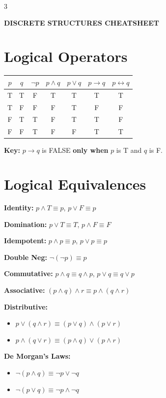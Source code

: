 \documentclass[10pt,landscape,a4paper]{article}
\newcommand{\globalopacity}{1}  %
\newcommand{\tand}{\wedge}
\newcommand{\tor}{\vee}
\newcommand{\tnot}{\neg}
\newcommand{\timplies}{\rightarrow}
\newcommand{\tiff}{\leftrightarrow}
\begin{document}
\transparent{\globalopacity}  %
\begin{multicols}{3}

\begin{center}
\textbf{\Large DISCRETE STRUCTURES CHEATSHEET}
\end{center}

\section*{Logical Operators}
\begin{tabular}{|c|c||c|c|c|c|c|}
\hline
$p$ & $q$ & $\tnot p$ & $p \tand q$ & $p \tor q$ & $p \timplies q$ & $p \tiff q$ \\
\hline
T & T & F & T & T & T & T \\
T & F & F & F & T & F & F \\
F & T & T & F & T & T & F \\
F & F & T & F & F & T & T \\
\hline
\end{tabular}

\textbf{Key:} $p \timplies q$ is FALSE \textbf{only when} $p$ is T and $q$ is F.

\section*{Logical Equivalences}

\textbf{Identity:} $p \tand T \equiv p$, \quad $p \tor F \equiv p$

\textbf{Domination:} $p \tor T \equiv T$, \quad $p \tand F \equiv F$

\textbf{Idempotent:} $p \tand p \equiv p$, \quad $p \tor p \equiv p$

\textbf{Double Neg:} $\tnot(\tnot p) \equiv p$

\textbf{Commutative:} $p \tand q \equiv q \tand p$, \quad $p \tor q \equiv q \tor p$

\textbf{Associative:} $(p \tand q) \tand r \equiv p \tand (q \tand r)$

\textbf{Distributive:}
\begin{itemize}[nosep,leftmargin=*]
\item $p \tor (q \tand r) \equiv (p \tor q) \tand (p \tor r)$
\item $p \tand (q \tor r) \equiv (p \tand q) \tor (p \tand r)$
\end{itemize}

\textbf{De Morgan's Laws:}
\begin{itemize}[nosep,leftmargin=*]
\item $\tnot(p \tand q) \equiv \tnot p \tor \tnot q$
\item $\tnot(p \tor q) \equiv \tnot p \tand \tnot q$
\end{itemize}


\end{multicols}
\end{document}
